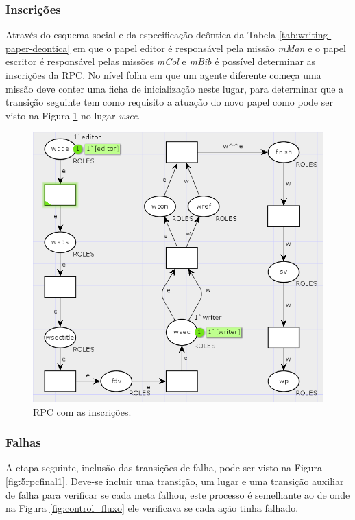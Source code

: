 \subsubsection{Inscrições}

Através do esquema social e da especificação deôntica da Tabela \ref{tab:writing-paper-deontica} em que o papel editor é responsável pela missão \textit{mMan} e o papel escritor é responsável pelas missões \textit{mCol} e \textit{mBib} é possível determinar as inscrições da RPC. No nível folha em que um agente diferente começa uma missão deve conter uma ficha de inicialização neste lugar, para determinar que a transição seguinte tem como requisito a atuação do novo papel como pode ser visto na Figura \ref{fig:5inscricao1} no lugar \textit{wsec}.

\begin{figure}[ht]
\centering
\includegraphics[scale=0.7]{imagens/5-inscricao1.png}
\caption{RPC com as inscrições.}
\label{fig:5inscricao1}
\end{figure}

\subsubsection{Falhas}

A etapa seguinte, inclusão das transições de falha, pode ser visto na Figura \ref{fig:5rpcfinal1}. Deve-se incluir uma transição, um lugar e uma transição auxiliar de falha para verificar se cada meta falhou, este processo é semelhante ao de \cite{winikoff2017bdi} onde na Figura \ref{fig:control_fluxo} ele verificava se cada ação tinha falhado.

